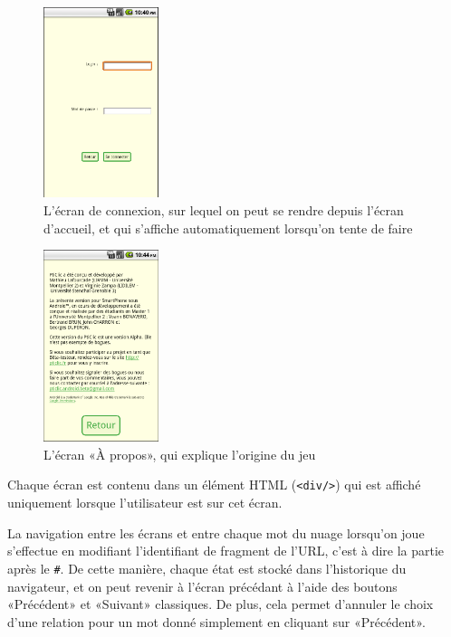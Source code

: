 \documentclass[a4paper,11pt,french]{article}
\begin{document}
\begin{figure}[h!]
  \centering
      \includegraphics[width=0.3\textwidth]{img/phone-cnx.png}
  \caption{L'écran de connexion, sur lequel on peut se rendre depuis l'écran d'accueil, et qui s'affiche automatiquement lorsqu'on tente de faire}
\end{figure}


\begin{figure}[h!]
  \centering
      \includegraphics[width=0.3\textwidth]{img/phone-info.png}
  \caption{L'écran «À propos», qui explique l'origine du jeu}
\end{figure}


Chaque écran est contenu dans un élément HTML (\verb!<div/>!) qui est affiché uniquement lorsque l'utilisateur est sur cet écran.

La navigation entre les écrans et entre chaque mot du nuage lorsqu'on joue s'effectue en modifiant l'identifiant de fragment
de l'URL, c'est à dire la partie après le \verb!#!. De cette manière, chaque état est stocké dans l'historique du navigateur, et on peut revenir à
l'écran précédant à l'aide des boutons «Précédent» et «Suivant» classiques. De plus, cela permet d'annuler le choix d'une relation pour
un mot donné simplement en cliquant sur «Précédent».
\end{document}
